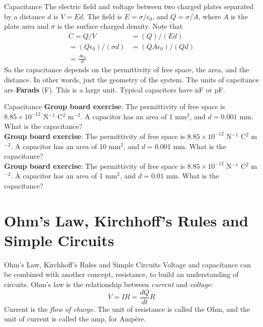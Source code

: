 \documentclass{beamer}
\begin{document}
\begin{frame}{Capacitance}
The electric field and voltage between two charged plates separated by a distance $d$ is $V = Ed$.  The field is $E = \sigma/\epsilon_0$, and $Q = \sigma/A$, where $A$ is the plate area and $\sigma$ is the surface charged density.  Note that
\begin{align}
C = Q/V &= (Q)/(E d) \\
= (Q \epsilon_0)/(\sigma d) &= (Q A \epsilon_0)/(Q d) \\
= \frac{A \epsilon_0}{d} &
\end{align}
So the capacitance depends on the permittivity of free space, the area, and the distance.  In other words, just the geometry of the system.  The units of capcitance are \textbf{\alert{Farads}} (F).  This is a large unit.  Typical capacitors have nF or pF.
\end{frame}

\begin{frame}{Capacitance}
\textbf{Group board exercise}: The permittivity of free space is $8.85 \times 10^{-12}$ N$^{-1}$ C$^2$ m$^{-2}$.  A capacitor has an area of 1 mm$^2$, and $d = 0.001$ mm.  What is the capacitance? \\ 
\textbf{Group board exercise}: The permittivity of free space is $8.85 \times 10^{-12}$ N$^{-1}$ C$^2$ m$^{-2}$.  A capacitor has an area of 10 mm$^2$, and $d = 0.001$ mm.  What is the capacitance? \\
\textbf{Group board exercise}: The permittivity of free space is $8.85 \times 10^{-12}$ N$^{-1}$ C$^2$ m$^{-2}$.  A capacitor has an area of 1 mm$^2$, and $d = 0.01$ mm.  What is the capacitance?
\end{frame}

\section{Ohm's Law, Kirchhoff's Rules and Simple Circuits}

\begin{frame}{Ohm's Law, Kirchhoff's Rules and Simple Circuits}
Voltage and capacitance can be combined with another concept, \alert{resistance}, to build an understanding of \alert{circuits}.  Ohm's law is the relationship between \textit{current} and \textit{voltage}:
\begin{equation}
V = I R = \frac{dQ}{dt}R
\end{equation}
Current is the \textit{flow of charge.}  The unit of resistance is called the Ohm, and the unit of current is called the amp, for Amp\`{e}re.
\end{frame}
\end{document}
